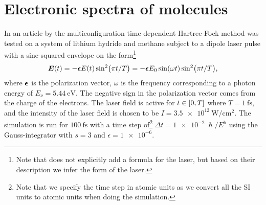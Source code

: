     \section{Electronic spectra of molecules}
        \label{sec:nest}
        In an article by \citeauthor{nest} \cite{nest} the
        multiconfiguration time-dependent Hartree-Fock method was tested on
        a system of lithium hydride and methane subject to a dipole
        laser pulse with a sine-squared envelope on the form\footnote{%
            Note that \citeauthor{nest} \cite{nest} does not explicitly add
            a formula for the laser, but based on their description we infer
            the form of the laser.
        }
        \begin{align}
            \boldsymbol{E}(t)
            = -\boldsymbol{\epsilon} E(t)
            \sin[2](\pi t / T)
            = -\boldsymbol{\epsilon} E_0 \sin(\omega t)
            \sin[2](\pi t / T),
            \label{eq:nest-laser}
        \end{align}
        where $\boldsymbol{\epsilon}$ is the polarization vector, $\omega$ is the
        frequency corresponding to a photon energy of $E_{\nu} =
        \SI{5.44}{\electronvolt}$.
        The negative sign in the polarization vector comes from the charge of
        the electrons.
        The laser field is active for $t \in \left[ 0, T \right]$ where $T =
        \SI{1}{\femto\second}$, and the intensity of the laser field is chosen
        to be $I = \SI{3.5e12}{\watt/\cm^2}$.
        The simulation is run for $\SI{100}{\femto\second}$ with a time step
        of\footnote{%
            Note that we specify the time step in atomic units as we convert all
            the SI units to atomic units when doing the simulation.
        }
        $\Delta t = \SI{1e-2}{\hslash/\hartree}$ using the Gauss-integrator with
        $s = 3$ and $\epsilon = \num{1e-6}$.
